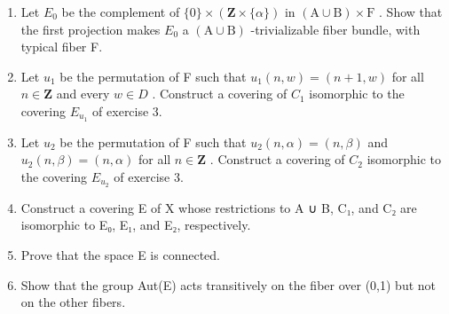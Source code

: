 \begin{enumerate}
\def\labelenumi{\alph{enumi})}
\item
  Let \(E_{0}\) be the complement of \(\{0\}\times(\mathbf{Z}\times\{\alpha\})\) in \((\mathrm{A}\cup\mathrm{B})\times\mathrm{F}\) . Show that the first projection makes \(E_{0}\) a \((\mathrm{A}\cup\mathrm{B})\) -trivializable fiber bundle, with typical fiber F.
\item
  Let \(u_{1}\) be the permutation of F such that \(u_{1}(n,w)=(n+1,w)\) for all \(n\in\mathbf{Z}\) and every \(w\in D\) . Construct a covering of \(C_{1}\) isomorphic to the covering \(E_{u_{1}}\) of exercise 3.
\item
  Let \(u_{2}\) be the permutation of F such that \(u_{2}(n,\alpha)=(n,\beta)\) and \(u_{2}(n,\beta)=(n,\alpha)\) for all \(n\in\mathbf{Z}\) . Construct a covering of \(C_{2}\) isomorphic to the covering \(E_{u_{2}}\) of exercise 3.
\item
  Construct a covering E of X whose restrictions to A ∪ B, C₁, and C₂ are isomorphic to E₀, E₁, and E₂, respectively.
\item
  Prove that the space E is connected.
\item
  Show that the group Aut(E) acts transitively on the fiber over (0,1) but not on the other fibers.
\end{enumerate}

